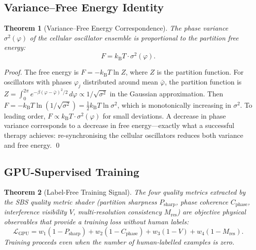 \documentclass[11pt,twocolumn,a4paper]{article}
\newtheorem{theorem}{Theorem}[section]
\newcommand{\kb}{k_{\mathrm{B}}}
\begin{document}
\subsection{Variance--Free Energy Identity}

\begin{theorem}[Variance--Free Energy Correspondence]
\label{thm:variance-free-energy}
The phase variance $\sigma^2(\varphi)$ of the cellular oscillator
ensemble is proportional to the partition free energy:
\begin{equation}
  F = \kb T \cdot \sigma^2(\varphi).
  \label{eq:variance-free-energy}
\end{equation}
\end{theorem}

\begin{proof}
The free energy is $F = -\kb T \ln Z$, where $Z$ is the partition
function.  For oscillators with phases $\varphi_j$ distributed around
mean $\bar{\varphi}$, the partition function is
$Z = \int_0^{2\pi} e^{-\beta(\varphi - \bar{\varphi})^2/2}\,d\varphi
\propto 1/\sqrt{\sigma^2}$ in the Gaussian approximation.  Then
$F = -\kb T \ln(1/\sqrt{\sigma^2}) = \tfrac{1}{2}\kb T \ln \sigma^2$,
which is monotonically increasing in $\sigma^2$.  To leading order,
$F \propto \kb T \cdot \sigma^2(\varphi)$ for small deviations.
A decrease in phase variance corresponds to a decrease in free
energy---exactly what a successful therapy achieves: re-synchronising
the cellular oscillators reduces both variance and free energy.  \qed
\end{proof}


\subsection{GPU-Supervised Training}

\begin{theorem}[Label-Free Training Signal]
\label{thm:gpu-supervised}
The four quality metrics extracted by the SBS quality metric shader
(partition sharpness $P_{\mathrm{sharp}}$, phase coherence
$C_{\mathrm{phase}}$, interference visibility $V$, multi-resolution
consistency $M_{\mathrm{res}}$) are objective physical observables
that provide a training loss without human labels:
\begin{equation}
  \mathcal{L}_{\mathrm{GPU}} = w_1(1 - P_{\mathrm{sharp}})
  + w_2(1 - C_{\mathrm{phase}}) + w_3(1 - V)
  + w_4(1 - M_{\mathrm{res}}).
  \label{eq:gpu-loss}
\end{equation}
Training proceeds even when the number of human-labelled examples is
zero.
\end{theorem}
\end{document}
